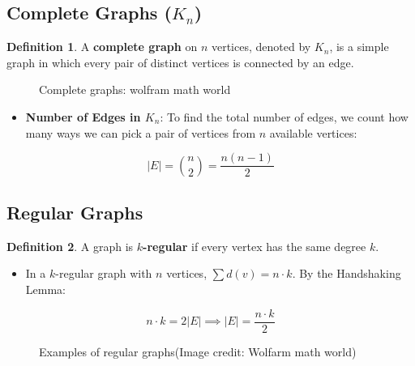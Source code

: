 \documentclass[
]{book}
\makeatletter
\newcommand*\pandocbounded[1]{%
  \sbox\pandoc@box{#1}%
  \Gscale@div\@tempa{\textheight}{\dimexpr\ht\pandoc@box+\dp\pandoc@box\relax}%
  \Gscale@div\@tempb{\linewidth}{\wd\pandoc@box}%
  \ifdim\@tempb\p@<\@tempa\p@\let\@tempa\@tempb\fi%
  \ifdim\@tempa\p@<\p@\scalebox{\@tempa}{\usebox\pandoc@box}%
  \else\usebox{\pandoc@box}%
  \fi%
}
\providecommand{\tightlist}{%
  \setlength{\itemsep}{0pt}\setlength{\parskip}{0pt}}
\theoremstyle{definition}
\newtheorem{definition}{Definition}[chapter]
\theoremstyle{definition}
\theoremstyle{definition}
\theoremstyle{definition}
\theoremstyle{remark}
\makeatother
\begin{document}
\subsection{\texorpdfstring{Complete Graphs (\(K_n\))}{Complete Graphs (K\_n)}}\label{complete-graphs-k_n}

\begin{definition}
\protect\hypertarget{def:unnamed-chunk-7}{}\label{def:unnamed-chunk-7}A \textbf{complete graph} on \(n\) vertices, denoted by \(K_n\), is a simple graph in which every pair of distinct vertices is connected by an edge.
\end{definition}

\begin{figure}
\centering
\pandocbounded{}
\caption{Complete graphs: wolfram math world}
\end{figure}

\begin{itemize}
\tightlist
\item
  \textbf{Number of Edges in \(K_n\)}:
  To find the total number of edges, we count how many ways we can pick a pair of vertices from \(n\) available vertices:
\end{itemize}

\[\vert{}E\vert{} = \binom{n}{2} = \frac{n(n - 1)}{2}\]

\subsection{Regular Graphs}\label{regular-graphs}

\begin{definition}
\protect\hypertarget{def:unnamed-chunk-8}{}\label{def:unnamed-chunk-8}A graph is \textbf{\(k\)-regular} if every vertex has the same degree \(k\).
\end{definition}

\begin{itemize}
\tightlist
\item
  In a \(k\)-regular graph with \(n\) vertices, \(\sum d(v) = n \cdot k\). By the Handshaking Lemma:
\end{itemize}

\[n \cdot k = 2\vert{}E\vert{} \implies \vert{}E\vert{} = \frac{n \cdot k}{2}\]

\begin{figure}
\centering
\pandocbounded{}
\caption{Examples of regular graphs(Image credit: Wolfarm math world)}
\end{figure}
\end{document}
